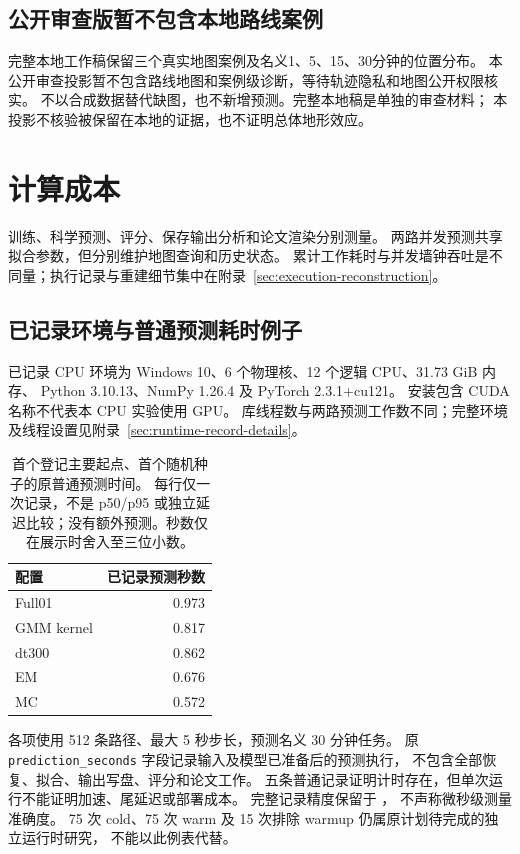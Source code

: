 \documentclass[UTF8,11pt]{ctexart}
\begin{document}
\subsection{公开审查版暂不包含本地路线案例}
\label{sec:case-horizons}
完整本地工作稿保留三个真实地图案例及名义1、5、15、30分钟的位置分布。
本公开审查投影暂不包含路线地图和案例级诊断，等待轨迹隐私和地图公开权限核实。
不以合成数据替代缺图，也不新增预测。完整本地稿是单独的审查材料；
本投影不核验被保留在本地的证据，也不证明总体地形效应。

\clearpage
\section{计算成本}
训练、科学预测、评分、保存输出分析和论文渲染分别测量。
两路并发预测共享拟合参数，但分别维护地图查询和历史状态。
累计工作耗时与并发墙钟吞吐是不同量；执行记录与重建细节集中在附录~\ref{sec:execution-reconstruction}。

\subsection{已记录环境与普通预测耗时例子}
\label{sec:preliminary-cost}
已记录 CPU 环境为 Windows 10、6 个物理核、12 个逻辑 CPU、31.73 GiB 内存、
Python 3.10.13、NumPy 1.26.4 及 PyTorch 2.3.1+cu121。
安装包含 CUDA 名称不代表本 CPU 实验使用 GPU。
库线程数与两路预测工作数不同；完整环境及线程设置见附录~\ref{sec:runtime-record-details}。

\begin{table}[htbp]
\centering\small
\caption{首个登记主要起点、首个随机种子的原普通预测时间。
每行仅一次记录，不是 p50/p95 或独立延迟比较；没有额外预测。秒数仅在展示时舍入至三位小数。}
\label{tab:preliminary-cost}
\begin{tabular}{@{}lr@{}}
\toprule
配置 & 已记录预测秒数\\
\midrule
Full01 & 0.973\\
GMM kernel & 0.817\\
dt300 & 0.862\\
EM & 0.676\\
MC & 0.572\\
\bottomrule
\end{tabular}
\end{table}
各项使用 512 条路径、最大 5 秒步长，预测名义 30 分钟任务。
原 \texttt{prediction\_seconds} 字段记录输入及模型已准备后的预测执行，
不包含全部恢复、拟合、输出写盘、评分和论文工作。
五条普通记录证明计时存在，但单次运行不能证明加速、尾延迟或部署成本。
完整记录精度保留于 ，
不声称微秒级测量准确度。
75 次 cold、75 次 warm 及 15 次排除 warmup 仍属原计划待完成的独立运行时研究，
不能以此例表代替。
\end{document}
